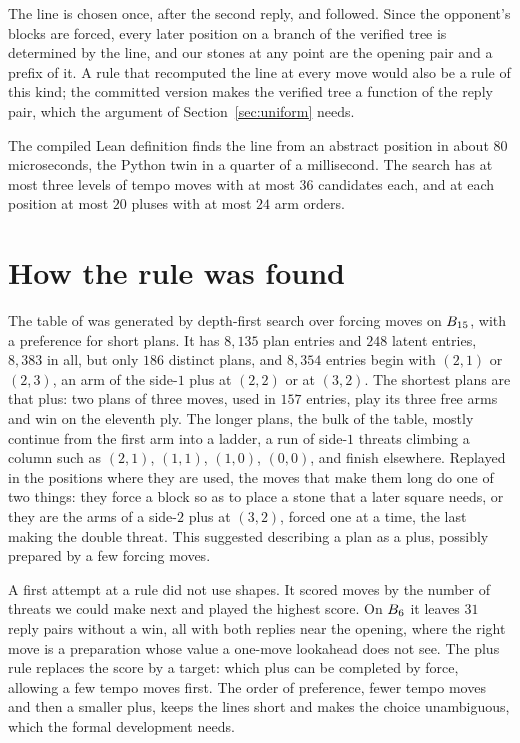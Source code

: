\documentclass[11pt]{amsart}
\theoremstyle{definition}
\theoremstyle{remark}
\begin{document}
The line is chosen once, after the second reply, and followed. Since
the opponent's blocks are forced, every later position on a branch of
the verified tree is determined by the line, and our stones at any
point are the opening pair and a prefix of it. A rule that recomputed
the line at every move would also be a rule of this kind; the
committed version makes the verified tree a function of the reply
pair, which the argument of Section~\ref{sec:uniform} needs.

The compiled Lean definition finds the line from an abstract position
in about $80$ microseconds, the Python twin in a quarter of a
millisecond. The search has at most three
levels of tempo moves with at most $36$ candidates each, and at each
position at most $20$ pluses with at most $24$ arm orders.

\section{How the rule was found}\label{sec:how}

The table of \cite{reid-threshold} was generated by depth-first search
over forcing moves on $B_{15}$, with a preference for short plans.
It has $8{,}135$ plan entries and $248$ latent entries, $8{,}383$ in
all, but only $186$ distinct plans, and $8{,}354$ entries begin with
$(2,1)$ or $(2,3)$, an arm of the side-$1$ plus at $(2,2)$ or at
$(3,2)$. The shortest plans are that plus: two plans of three moves,
used in $157$ entries, play its three free arms and win on the
eleventh ply. The longer plans, the bulk of the table, mostly continue from the
first arm into a ladder, a run of side-$1$ threats climbing a column
such as $(2,1)$, $(1,1)$, $(1,0)$, $(0,0)$, and finish elsewhere.
Replayed in the positions where they are used, the moves that make them
long do one of two things: they force a block so as to place a stone
that a later square needs, or they are the arms of a side-$2$ plus at
$(3,2)$, forced one at a time, the last making the double threat. This
suggested describing a plan as a plus, possibly prepared by a few
forcing moves.

A first attempt at a rule did not use shapes. It scored moves by the
number of threats we could make next and played the highest score. On
$B_6$ it leaves $31$ reply pairs without a win, all with both
replies near the opening, where the right move is a preparation whose
value a one-move lookahead does not see. The plus rule replaces the
score by a target: which plus can be completed by force, allowing a
few tempo moves first. The order of preference, fewer tempo moves and
then a smaller plus, keeps the lines short and makes the choice
unambiguous, which the formal development needs.
\end{document}
